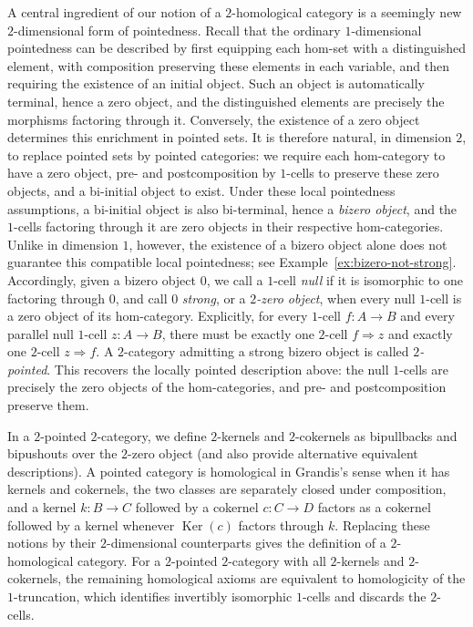 \documentclass[11pt,reqno,a4paper]{amsart}
\theoremstyle{definition}
\theoremstyle{remark}
\newcommand{\0}{\mathbf{0}}
\renewcommand{\1}{\mathbf{1}}
\DeclareMathOperator{\Ker}{Ker}
\begin{document}
A central ingredient of our notion of a $2$-homological category is a seemingly new
$2$-dimensional form of pointedness. Recall that the ordinary 
$1$-dimensional pointedness can be described by first equipping each
hom-set with a distinguished element, with composition preserving these
elements in each variable, and then requiring the existence of an initial
object. Such an object is automatically terminal, hence a zero object,
and the distinguished elements are precisely the morphisms factoring
through it. Conversely, the existence of a zero object determines this
enrichment in pointed sets. It is therefore natural, in dimension $2$,
to replace pointed sets by pointed categories: we require each
hom-category to have a zero object, pre- and postcomposition by
$1$-cells to preserve these zero objects, and a bi-initial object to
exist. Under these local pointedness assumptions, a bi-initial object
is also bi-terminal, hence a \emph{bizero object}, and the $1$-cells
factoring through it are zero objects in their respective hom-categories.
Unlike in dimension $1$, however, the existence of a bizero object
alone does not guarantee this compatible local pointedness; see Example~\ref{ex:bizero-not-strong}.
Accordingly, given a bizero object $0$, we call a $1$-cell \emph{null}
if it is isomorphic to one factoring through $0$, and call $0$
\emph{strong}, or a \emph{$2$-zero object}, when every null $1$-cell
is a zero object of its hom-category. Explicitly, for every
$1$-cell $f:A\to B$ and every parallel null $1$-cell $z:A\to B$,
there must be exactly one $2$-cell $f\Rightarrow z$ and exactly one
$2$-cell $z\Rightarrow f$.
A $2$-category admitting a strong bizero object is called
\emph{$2$-pointed}. This recovers the locally pointed description
above: the null $1$-cells are precisely the zero objects of the
hom-categories, and pre- and postcomposition preserve them.

In a $2$-pointed $2$-category, we define $2$-kernels and $2$-cokernels as bipullbacks and bipushouts over the $2$-zero object (and also provide alternative equivalent descriptions). A pointed category is homological in Grandis's sense when it has kernels and cokernels, the two classes are separately closed under composition, and a kernel $k:B\to C$ followed by a cokernel $c:C\to D$ factors as a cokernel followed by a kernel whenever $\Ker(c)$ factors through $k$. Replacing these notions by their $2$-dimensional counterparts gives the definition of a $2$-homological category. For a $2$-pointed $2$-category with all $2$-kernels and $2$-cokernels, the remaining homological axioms are equivalent to homologicity of the $1$-truncation, which identifies invertibly isomorphic $1$-cells and discards the $2$-cells.
\end{document}

